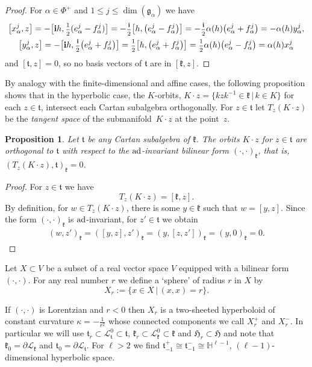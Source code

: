 \documentclass[pdftex]{sigma}
\numberwithin{equation}{section}
\newtheorem{Proposition}[Theorem]{Proposition}
 { \theoremstyle{definition}
\newtheorem{Definition}[Theorem]{Definition}
\newtheorem{Remark}[Theorem]{Remark} }
\def\H{\mathbb{H}}
\def\a{\alpha}
\def\bi{{\bf i}}
\def\shf{\textrm{\scriptsize$\frac{1}{2}$\normalsize}}
\def\sbihf{\textrm{\scriptsize$\frac{\bi}{2}$\normalsize}}
\def\cL{\mathcal L}
\def\g{\mathfrak{g}}
\def\fH{\mathfrak{H}}
\def\k{\mathfrak{k}}
\def\fk{\mathfrak{k}}
\def\ft{\mathfrak{t}}
\begin{document}
\begin{proof}For $\alpha\in\Phi^+$ and $1\leq j\leq \dim (\g_{\alpha})$ we have
\begin{gather*}
\big[x_\a^j, z\big] = - \big[\bi h, \shf(e_\a^j-f_\a^j)\big] = -\sbihf \big[h, \big(e_\a^j-f_\a^j\big)\big] = -\sbihf \a(h) \big(e_\a^j + f_\a^j\big) = -\a(h) y_\a^j,\\
 \big[y_\a^j, z\big] = - \big[\bi h, \sbihf \big(e_\a^j+f_\a^j\big)\big] = \shf \big[h, \big(e_\a^j+f_\a^j\big)\big] = \shf \a(h) \big(e_\a^j - f_\a^j\big) = \a(h) x_\a^j
\end{gather*}
and $[\ft,z] = 0$, so no basis vectors of $\ft$ are in $[\k,z]$.
\end{proof}

By analogy with the finite-dimensional and affine cases, the following proposition shows that in the hyperbolic case, the $K$-orbits, $K\cdot z = \big\{k z k^{-1}\in \fk \,|\, k\in K\big\}$ for each $z\in\ft$, intersect each Cartan subalgebra orthogonally. For $z\in \ft$ let $T_z (K\cdot z)$ be the {\it tangent space} of the submanifold~$K\cdot z$ at the point~$z$.

\begin{Proposition}\label{proposition:orbits orthogonal} Let $\ft$ be any Cartan subalgebra of $\k$.
The orbits $K\cdot z$ for $z\in \ft$ are orthogonal to $\ft$ with respect to the ${\rm ad}$-invariant bilinear form $(\cdot, \cdot)_{\k}$, that is, $(T_z(K\cdot z),\ft)_{\k}=0$.
\end{Proposition}

\begin{proof} For $z\in \ft$ we have
\[T_z (K\cdot z)=[\k,z] .\]
By definition, for $w\in T_z(K\cdot z)$, there is some $y\in \k$ such that $w=[y,z]$. Since the form $(\cdot, \cdot)_{\k}$ is ${\rm ad}$-invariant, for $z'\in \ft$ we obtain
\begin{gather*}
(w,z')_{\k}=([y,z],z')_{\k}=(y,[z,z'])_{\k}=(y,0)_{\k}=0.\tag*{\qed}
 \end{gather*} \renewcommand{\qed}{}
\end{proof}

\begin{Definition}\label{definition:surface_notation} Let $X\subset V$ be a subset of a real vector space $V$ equipped with a bilinear form $(\cdot, \cdot)$. For any real number $r$ we define a `sphere' of radius $r$ in $X$ by
\[X_{r}:=\{x\in X\, |\, (x,x)=r\}.\]
\end{Definition}

If $(\cdot, \cdot)$ is Lorentzian and $r<0$ then $X_r$ is a two-sheeted hyperboloid of constant curvature $\kappa=-\frac{1}{r^2}$ whose connected components we call $X_r^+$ and $X_r^-$.
In particular we will use $\ft_{r}\subset \cL_\ft^0 \subset\ft$, $\k_r\subset \cL_\k^0\subset \k$ and $\fH_{r}\subset \fH$ and note that $\k_0=\partial\cL_\k$ and $\ft_0=\partial\cL_\ft$. For $\ell > 2$ we find $\ft_{-1}^+\cong\ft_{-1}^-\cong \H^{\ell-1}$, $(\ell-1)$-dimensional hyperbolic space.
\end{document}
